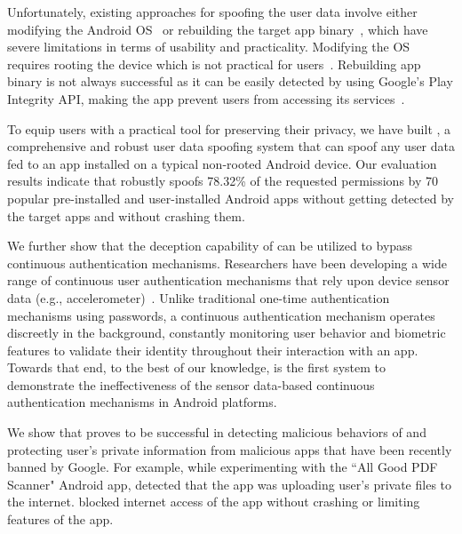 Unfortunately, existing approaches for spoofing the user data involve either modifying the Android OS~\cite{smalley2013security, raval2016you, wu2017context} or rebuilding the target app binary~\cite{backes2015boxify, jeon2012dr}, which have severe limitations in terms of usability and practicality. Modifying the OS requires rooting the device which is not practical for users~\cite{zhang2015android}. Rebuilding app binary is not always successful as it can be easily detected by using Google's Play Integrity API, making the app prevent users from accessing its services~\cite{andPlayIntAPI}. 

To equip users with a practical tool for preserving their privacy, we have built \textit{\framework{}}, a comprehensive and robust user data spoofing system that can spoof any user data fed to an app installed on a typical non-rooted Android device. Our evaluation results indicate that \framework{} robustly spoofs 78.32\% of the requested permissions by 70 popular pre-installed and user-installed Android apps without getting detected by the target apps and without crashing them.

We further show that the deception capability of \framework{} can be utilized to bypass continuous authentication mechanisms. Researchers have been developing a wide range of continuous user authentication mechanisms that rely upon device sensor data (e.g., accelerometer)~\cite{kolokas2019gait, sun2018artificial, thang2012gait, hoang2013adaptive, shih2015flick, nohara2016personal, lu2015safeguard, jain2015exploring, nixon2016slowmo, feng2014tips, abuhamad2020autosen, amini2018deepauth, li2018using, yan2018towards, song2016eyeveri, xia2018motionhacker, hong2016mgra, hong2015waving, miguel2016interaction, zhang2016voicelive, wang2019voicepop, johnson2013secure, khamis2016gazetouchpass, zhu2013sensec, sitova2015hmog, pang2019mineauth, acien2019multilock, zhu2019riskcog, lee2017implicit}. Unlike traditional one-time authentication mechanisms using passwords, a continuous authentication mechanism operates discreetly in the background, constantly monitoring user behavior and biometric features to validate their identity throughout their interaction with an app. Towards that end, to the best of our knowledge, \framework{} is the first system to demonstrate the ineffectiveness of the sensor data-based continuous authentication mechanisms in Android platforms.



We show that \framework{} proves to be successful in detecting malicious behaviors of and protecting user's private information from malicious apps that have been recently banned by Google. For example, while experimenting with the ``All Good PDF Scanner" Android app, \framework{} detected that the app was uploading user's private files to the internet. \framework{} blocked internet access of the app without crashing or limiting features of the app.

